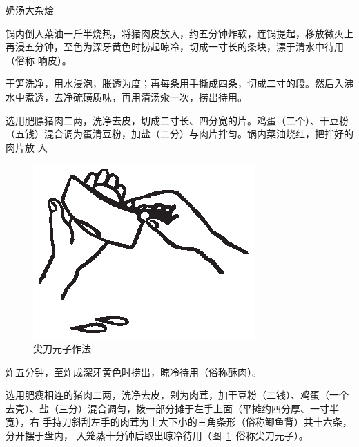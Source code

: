\begin{recipe}{奶汤大杂烩}

\ingredients


\preparation

\step 锅内倒入菜油一斤半烧热，将猪肉皮放入，约五分钟炸软，连锅提起，移放微火上
再浸五分钟，至色为深牙黄色时捞起晾冷，切成一寸长的条块，漂于清水中待用（俗称
响皮）。

\step 干笋洗净，用水浸泡，胀透为度；再每条用手撕成四条，切成二寸的段。然后入沸
水中煮透，去净硫磺质味，再用清汤汆一次，捞出待用。

\step 选用肥膘猪肉二两，洗净去皮，切成二寸长、四分宽的片。鸡蛋（二个）、干豆粉
（五钱）混合调为蛋清豆粉，加盐（二分）与肉片拌匀。锅内菜油烧红，把拌好的肉片放
入
\begin{figure}%
\begin{center}%
\vspace{-.3125\baselineskip}%
\quad\includegraphics[scale=1]{illustration-001.eps}%
\vspace{-.1875\baselineskip}%
\caption{尖刀元子作法}
\label{dagger meatballs}
\end{center}%
\end{figure}%
炸五分钟，至炸成深牙黄色时捞出，晾冷待用（俗称酥肉）。

\step 选用肥瘦相连的猪肉二两，洗净去皮，剁为肉茸，加干豆粉（二钱）、鸡蛋（一个
去壳）、盐（三分）混合调匀，拨一部分摊于左手上面（平摊约四分厚、一寸半宽），右
手持刀斜刮左手的肉茸为上大下小的三角条形（俗称鲫鱼背）共十六条，分开摆于盘内，
入笼蒸十分钟后取出晾冷待用（图~\ref{dagger meatballs}~俗称尖刀元子）。


\end{recipe}

